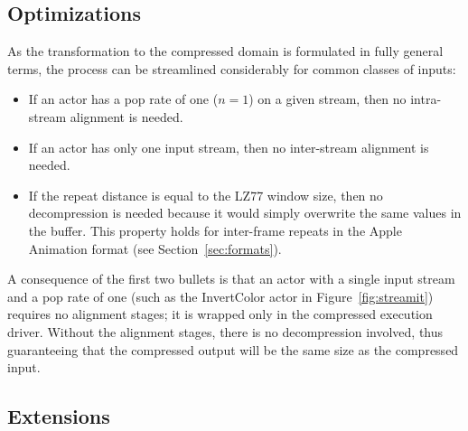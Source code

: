 \subsection{Optimizations}
\label{sec:opt}

As the transformation to the compressed domain is formulated in
fully general terms, the process can be streamlined considerably for
common classes of inputs:
\begin{itemize}
\item If an actor has a pop rate of one ($n=1$) on a given stream,
then no intra-stream alignment is needed.
\item If an actor has only one input stream, then no inter-stream
alignment is needed.
\item If the repeat distance is equal to the LZ77 window size, then no
decompression is needed because it would simply overwrite the same
values in the buffer.  This property holds for inter-frame repeats in
the Apple Animation format (see Section~\ref{sec:formats}).
\end{itemize}
A consequence of the first two bullets is that an actor with a single
input stream and a pop rate of one (such as the InvertColor actor in
Figure~\ref{fig:streamit}) requires no alignment stages; it is wrapped
only in the compressed execution driver.  Without the alignment
stages, there is no decompression involved, thus guaranteeing that the
compressed output will be the same size as the compressed input.

\subsection{Extensions}
\label{sec:extensions}

